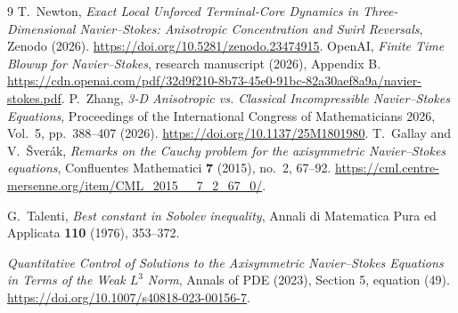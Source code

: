 \documentclass[11pt]{article}
\begin{document}










\begin{thebibliography}{9}
T.~Newton, \emph{Exact Local Unforced Terminal-Core Dynamics in Three-Dimensional Navier--Stokes: Anisotropic Concentration and Swirl Reversals}, Zenodo (2026). \url{https://doi.org/10.5281/zenodo.23474915}.
OpenAI, \emph{Finite Time Blowup for Navier--Stokes}, research manuscript (2026), Appendix B.
\url{https://cdn.openai.com/pdf/32d9f210-8b73-45e0-91bc-82a30aef8a9a/navier-stokes.pdf}.
P.~Zhang, \emph{3-D Anisotropic vs. Classical Incompressible Navier--Stokes Equations}, Proceedings of the International Congress of Mathematicians 2026, Vol.~5, pp.~388--407 (2026). \url{https://doi.org/10.1137/25M1801980}.
T.~Gallay and V.~\v{S}ver\'ak, \emph{Remarks on the Cauchy problem for the axisymmetric Navier--Stokes equations},
Confluentes Mathematici \textbf{7} (2015), no.~2, 67--92.
\url{https://cml.centre-mersenne.org/item/CML_2015__7_2_67_0/}.

G.~Talenti, \emph{Best constant in Sobolev inequality},
Annali di Matematica Pura ed Applicata \textbf{110} (1976), 353--372.

\emph{Quantitative Control of Solutions to the Axisymmetric Navier--Stokes Equations in Terms of the Weak $L^3$ Norm},
Annals of PDE (2023), Section 5, equation (49).
\url{https://doi.org/10.1007/s40818-023-00156-7}.
\end{thebibliography}
\end{document}
